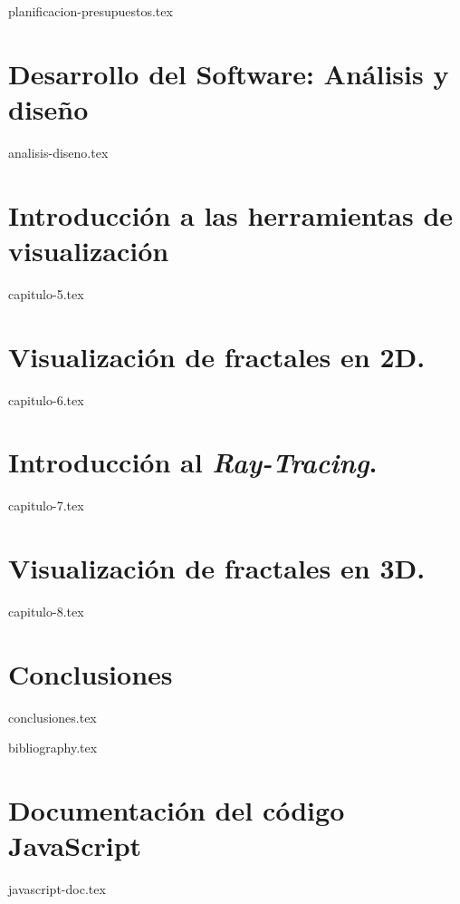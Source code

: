 \documentclass[twoside,openright,11pt]{report}
\begin{document}
{planificacion-presupuestos.tex}

\chapter*{Desarrollo del Software: Análisis y diseño}
\label{chap:analisis-diseno}

{analisis-diseno.tex}

\chapter{Introducción a las herramientas de visualización}
\label{chap:visualizacion}

{capitulo-5.tex}

\chapter{Visualización de fractales en 2D.}
\label{chap:fractales-2D}

{capitulo-6.tex}

\chapter{Introducción al \textit{Ray-Tracing}.}
\label{chap:ray-tracing}

{capitulo-7.tex}

\chapter{Visualización de fractales en 3D.}
\label{chap:fractales-3D}

{capitulo-8.tex}

\chapter*{Conclusiones}
\label{chap:conclusiones}

{conclusiones.tex}


{bibliography.tex}


\appendix
\cleardoublepage


\chapter{Documentación del código JavaScript}
\label{appendix:javascript}

{javascript-doc.tex}
\end{document}

